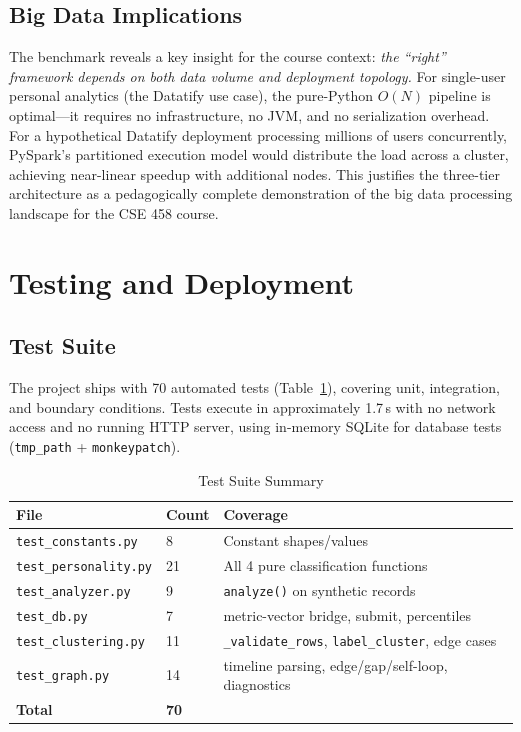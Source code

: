 \documentclass[conference]{IEEEtran}
\begin{document}
\subsection{Big Data Implications}

The benchmark reveals a key insight for the course context: \emph{the
``right'' framework depends on both data volume and deployment topology.}
For single-user personal analytics (the Datatify use case), the pure-Python
$O(N)$ pipeline is optimal—it requires no infrastructure, no JVM, and no
serialization overhead. For a hypothetical Datatify deployment processing
millions of users concurrently, PySpark's partitioned execution model would
distribute the load across a cluster, achieving near-linear speedup with
additional nodes. This justifies the three-tier architecture as a
pedagogically complete demonstration of the big data processing landscape
for the CSE 458 course.

\section{Testing and Deployment}

\subsection{Test Suite}

The project ships with 70 automated tests (Table~\ref{tab:tests}), covering
unit, integration, and boundary conditions. Tests execute in approximately
1.7\,s with no network access and no running HTTP server, using in-memory
SQLite for database tests (\texttt{tmp\_path} + \texttt{monkeypatch}).

\begin{table}[ht]
\caption{Test Suite Summary}
\label{tab:tests}
\centering
\begin{tabular}{llp{3.8cm}}
\toprule
\textbf{File} & \textbf{Count} & \textbf{Coverage} \\
\midrule
\texttt{test\_constants.py}   & 8  & Constant shapes/values \\
\texttt{test\_personality.py} & 21 & All 4 pure classification functions \\
\texttt{test\_analyzer.py}    & 9  & \texttt{analyze()} on synthetic records \\
\texttt{test\_db.py}          & 7  & metric-vector bridge, submit, percentiles \\
\texttt{test\_clustering.py}  & 11 & \texttt{\_validate\_rows}, \texttt{label\_cluster}, edge cases \\
\texttt{test\_graph.py}       & 14 & timeline parsing, edge/gap/self-loop, diagnostics \\
\midrule
\textbf{Total}                & \textbf{70} & \\
\bottomrule
\end{tabular}
\end{table}
\end{document}
